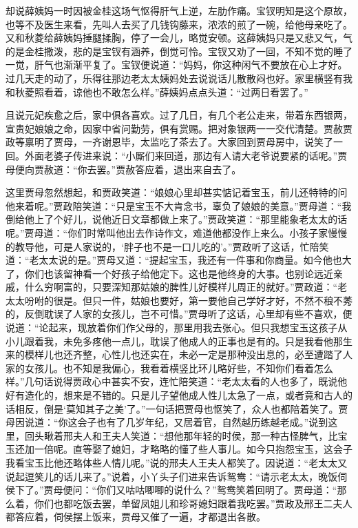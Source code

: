 


\begin{parag}
    却说薛姨妈一时因被金桂这场气怄得肝气上逆，左肋作痛。宝钗明知是这个原故，也等不及医生来看，先叫人去买了几钱钩藤来，浓浓的煎了一碗，给他母亲吃了。又和秋菱给薛姨妈捶腿揉胸，停了一会儿，略觉安顿。这薛姨妈只是又悲又气，气的是金桂撒泼，悲的是宝钗有涵养，倒觉可怜。宝钗又劝了一回，不知不觉的睡了一觉，肝气也渐渐平复了。宝钗便说道：“妈妈，你这种闲气不要放在心上才好。过几天走的动了，乐得往那边老太太姨妈处去说说话儿散散闷也好。家里横竖有我和秋菱照看着，谅他也不敢怎么样。”薛姨妈点点头道：“过两日看罢了。”
\end{parag}


\begin{parag}
    且说元妃疾愈之后，家中俱各喜欢。过了几日，有几个老公走来，带着东西银两，宣贵妃娘娘之命，因家中省问勤劳，俱有赏赐。把对象银两一一交代清楚。贾赦贾政等禀明了贾母，一齐谢恩毕，太监吃了茶去了。大家回到贾母房中，说笑了一回。外面老婆子传进来说：“小厮们来回道，那边有人请大老爷说要紧的话呢。”贾母便向贾赦道：“你去罢。”贾赦答应着，退出来自去了。
\end{parag}


\begin{parag}
    这里贾母忽然想起，和贾政笑道：“娘娘心里却甚实惦记着宝玉，前儿还特特的问他来着呢。”贾政陪笑道：“只是宝玉不大肯念书，辜负了娘娘的美意。”贾母道：“我倒给他上了个好儿，说他近日文章都做上来了。”贾政笑道：“那里能象老太太的话呢。”贾母道：“你们时常叫他出去作诗作文，难道他都没作上来么。小孩子家慢慢的教导他，可是人家说的，‘胖子也不是一口儿吃的’。”贾政听了这话，忙陪笑道：“老太太说的是。”贾母又道：“提起宝玉，我还有一件事和你商量。如今他也大了，你们也该留神看一个好孩子给他定下。这也是他终身的大事。也别论远近亲戚，什么穷啊富的，只要深知那姑娘的脾性儿好模样儿周正的就好。”贾政道：“老太太吩咐的很是。但只一件，姑娘也要好，第一要他自己学好才好，不然不稂不莠的，反倒耽误了人家的女孩儿，岂不可惜。”贾母听了这话，心里却有些不喜欢，便说道：“论起来，现放着你们作父母的，那里用我去张心。但只我想宝玉这孩子从小儿跟着我，未免多疼他一点儿，耽误了他成人的正事也是有的。只是我看他那生来的模样儿也还齐整，心性儿也还实在，未必一定是那种没出息的，必至遭踏了人家的女孩儿。也不知是我偏心，我看着横竖比环儿略好些，不知你们看着怎么样。”几句话说得贾政心中甚实不安，连忙陪笑道：“老太太看的人也多了，既说他好有造化的，想来是不错的。只是儿子望他成人性儿太急了一点，或者竟和古人的话相反，倒是‘莫知其子之美’了。”一句话把贾母也怄笑了，众人也都陪着笑了。贾母因说道：“你这会子也有了几岁年纪，又居着官，自然越历练越老成。”说到这里，回头瞅着邢夫人和王夫人笑道：“想他那年轻的时侯，那一种古怪脾气，比宝玉还加一倍呢。直等娶了媳妇，才略略的懂了些人事儿。如今只抱怨宝玉，这会子我看宝玉比他还略体些人情儿呢。”说的邢夫人王夫人都笑了。因说道：“老太太又说起逗笑儿的话儿来了。”说着，小丫头子们进来告诉鸳鸯：“请示老太太，晚饭伺侯下了。”贾母便问：“你们又咕咕唧唧的说什么？”鸳鸯笑着回明了。贾母道：“那么着，你们也都吃饭去罢，单留凤姐儿和珍哥媳妇跟着我吃罢。”贾政及邢王二夫人都答应着，伺侯摆上饭来，贾母又催了一遍，才都退出各散。
\end{parag}


